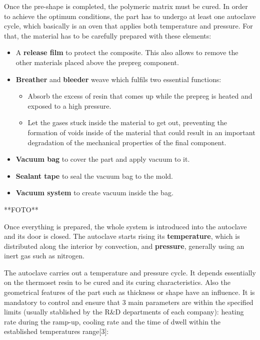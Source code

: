 Once the pre-shape is completed, the polymeric matrix must be cured. In order to achieve the optimum conditions, the part has to undergo at least one autoclave cycle, which basically is an oven that applies both temperature and pressure. For that, the material has to be carefully prepared with these elements:
\begin{itemize}
\item A \textbf{release film} to protect the composite. This also allows to remove the other materials placed above the prepreg component.
\item \textbf{Breather} and \textbf{bleeder} weave which fulfils two essential functions:
\begin{itemize}
\item Absorb the excess of resin that comes up while the prepreg is heated and exposed to a high pressure.
\item Let the gases stuck inside the material to get out, preventing the formation of voids inside of the material that could result in an important degradation of the mechanical properties of the final component.
\end{itemize}
\item \textbf{Vacuum bag} to cover the part and apply vacuum to it.
\item \textbf{Sealant tape} to seal the vacuum bag to the mold.
\item \textbf{Vacuum system} to create vacuum inside the bag.
\end{itemize}

**FOTO**

Once everything is prepared, the whole system is introduced into the autoclave and its door is closed. The autoclave starts rising its \textbf{temperature}, which is distributed along the interior by convection, and \textbf{pressure}, generally using an inert gas such as nitrogen.

The autoclave carries out a temperature and pressure cycle. It depends essentially on the thermoset resin to be cured and its curing characteristics. Also the geometrical features of the part such as thickness or shape have an influence. It is mandatory to control and ensure that 3 main parameters are within the specified limits (usually stablished by the R\&D departments of each company): heating rate during the ramp-up, cooling rate and the time of dwell within the established temperatures range[3]:

